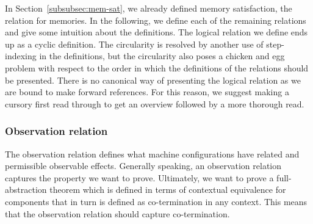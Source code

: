 \begin{jversion}
In Section~\ref{subsubsec:mem-sat}, we already defined memory satisfaction, the relation for memories.
In the following, we define each of the remaining relations and give some intuition about the definitions.
The logical relation we define ends up as a cyclic definition.
The circularity is resolved by another use of step-indexing in the definitions, but the circularity also poses a chicken and egg problem with respect to the order in which the definitions of the relations should be presented.
There is no canonical way of presenting the logical relation as we are bound to make forward references.
For this reason, we suggest making a cursory first read through to get an overview followed by a more thorough read.

\subsubsection{Observation relation}
\label{sec:observation-relation}
The observation relation defines what machine configurations have related and permissible observable effects.
Generally speaking, an observation relation captures the property we want to prove.
Ultimately, we want to prove a full-abstraction theorem which is defined in terms of contextual equivalence for components that in turn is defined as co-termination in any context.
This means that the observation relation should capture co-termination.


\end{jversion}
